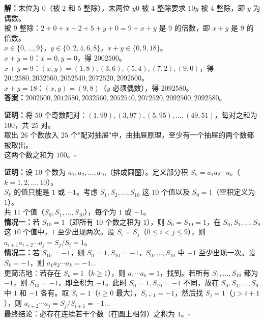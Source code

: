 \documentclass[12pt, a4paper]{ctexart}
\begin{document}
\begin{knowledgebox}[第2题]
\textbf{解：}末位为 $0$（被 $2$ 和 $5$ 整除），末两位 $y0$ 被 $4$ 整除要求 $10y$ 被 $4$ 整除，即 $y$ 为偶数。\\
被 $9$ 整除：$2+0+x+2+5+y+0=9+x+y$ 是 $9$ 的倍数，即 $x+y$ 是 $9$ 的倍数。\\
$x\in\{0,\ldots,9\}$，$y\in\{0,2,4,6,8\}$，$x+y\in\{0,9,18\}$。\\[4pt]
$x+y=0$：$x=0,y=0$，得 $2002500$。\\
$x+y=9$：$(x,y)=(1,8),(3,6),(5,4),(7,2),(9,0)$，得 $2012580, 2032560, 2052540, 2072520, 2092500$。\\
$x+y=18$：$(x,y)=(9,8)$（$y$ 必须偶数），得 $2092580$。\\[4pt]
\textbf{答案：}$2002500, 2012580, 2032560, 2052540, 2072520, 2092500, 2092580$。
\end{knowledgebox}

\begin{knowledgebox}[第3题]
\textbf{证明：}将 $50$ 个奇数配对：$(1,99),(3,97),(5,95),\ldots,(49,51)$，每对之和为 $100$，共 $25$ 对。\\
取出 $26$ 个数放入 $25$ 个"配对抽屉"中，由抽屉原理，至少有一个抽屉的两个数都被取出。\\
这两个数之和为 $100$。\hfill$\square$
\end{knowledgebox}

\begin{knowledgebox}[第4题]
\textbf{证明：}设 $10$ 个数为 $a_1,a_2,\ldots,a_{10}$（排成圆圈）。定义部分积 $S_k=a_1 a_2\cdots a_k$（$k=1,2,\ldots,10$）。\\[4pt]
$S_k$ 的值只能是 $1$ 或 $-1$。考虑 $S_1,S_2,\ldots,S_{10}$ 这 $10$ 个值以及 $S_0=1$（空积定义为 $1$）。\\[4pt]
共 $11$ 个值（$S_0,S_1,\ldots,S_{10}$），每个为 $1$ 或 $-1$。\\
\textbf{情况一：}若 $S_{10}=1$（即所有 $10$ 个数之积为 $1$），则 $S_0=S_{10}=1$，在 $S_0,S_1,\ldots,S_9$ 这 $10$ 个值中，$1$ 至少出现两次。设 $S_i=S_j$（$0\leqslant i<j\leqslant 9$），则 $a_{i+1}a_{i+2}\cdots a_j=S_j/S_i=1$。\\
\textbf{情况二：}若 $S_{10}=-1$，则 $S_0=1,S_{10}=-1$，$S_0,\ldots,S_{10}$ 中 $-1$ 至少出现一次。设 $S_k=-1$，则 $a_1 a_2\cdots a_k=-1$...\\[4pt]
更简洁地：若存在 $S_k=1$（$k\geqslant 1$），则 $a_1\cdots a_k=1$，找到。若所有 $S_1,\ldots,S_{10}$ 都为 $-1$，则 $S_{10}=-1$，即全积为 $-1$。此时 $S_0=1,S_{10}=-1$ 不同，故在 $S_0,S_1,\ldots,S_9$ 中 $1$ 和 $-1$ 各有。取 $S_i=1$（$i\geqslant 0$ 最大），$S_{i+1}=-1$，然后找 $S_j=1$（$j>i+1$），则 $a_{i+2}\cdots a_j=S_j/S_{i+1}=-1$...\\[4pt]
最终结论：必存在连续若干个数（在圆上相邻）之积为 $1$。\hfill$\square$
\end{knowledgebox}
\end{document}
